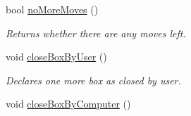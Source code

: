\begin{DoxyCompactItemize}
bool \hyperlink{classGame3Scene_a1e1507f4dbb2a32cb6a22c97fc3f0877}{no\-More\-Moves} ()
\begin{DoxyCompactList}\small\item\em \-Returns whether there are any moves left. \end{DoxyCompactList}\item 
\hypertarget{classGame3Scene_a32f5b4495727883849959f0d832ac398}{void \hyperlink{classGame3Scene_a32f5b4495727883849959f0d832ac398}{close\-Box\-By\-User} ()}\label{classGame3Scene_a32f5b4495727883849959f0d832ac398}

\begin{DoxyCompactList}\small\item\em \-Declares one more box as closed by user. \end{DoxyCompactList}\item 
\hypertarget{classGame3Scene_a866b77e044e76b8ea79447cc9f4a31f1}{void \hyperlink{classGame3Scene_a866b77e044e76b8ea79447cc9f4a31f1}{close\-Box\-By\-Computer} ()}\label{classGame3Scene_a866b77e044e76b8ea79447cc9f4a31f1}


\end{DoxyCompactItemize}
